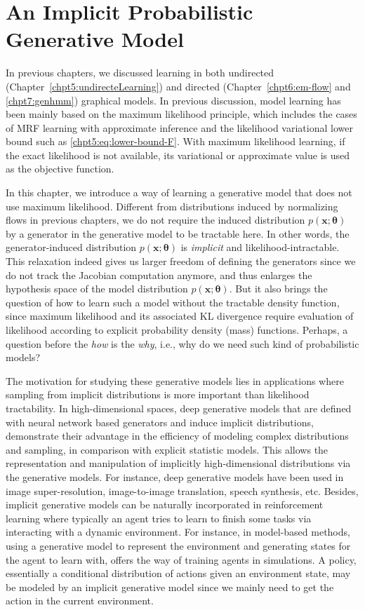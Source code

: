 \chapter{An Implicit Probabilistic Generative Model}
\label{chapter8}
\graphicspath{{source/chapter8/}}
In previous chapters, we discussed learning in both undirected (Chapter~\ref{chpt5:undirecteLearning}) and directed (Chapter~\ref{chpt6:em-flow} and \ref{chpt7:genhmm}) graphical models. In previous discussion, model learning has been mainly based on the maximum likelihood principle, which includes the cases of MRF learning with approximate inference and the likelihood variational lower bound such as \eqref{chpt5:eq:lower-bound-F}. With maximum likelihood learning, if the exact likelihood is not available, its variational or approximate value is used as the objective function.

In this chapter, we introduce a way of learning a generative model that does not use maximum likelihood. Different from distributions induced by normalizing flows in previous chapters, we do not require the induced distribution $p(\bm{x};\bm{\theta})$ by a generator in the generative model to be tractable here. In other words, the generator-induced distribution $p(\bm{x};\bm{\theta})$ is \textit{implicit} and likelihood-intractable. This relaxation indeed gives us larger freedom of defining the generators since we do not track the Jacobian computation anymore, and thus enlarges the hypothesis space of the model distribution $p(\bm{x};\bm{\theta})$. But it also brings the question of how to learn such a model without the tractable density function, since maximum likelihood and its associated KL divergence require evaluation of likelihood according to explicit probability density (mass) functions.  Perhaps, a question before the \textit{how} is the \textit{why}, i.e., why do we need such kind of probabilistic models?

The motivation for studying these generative models lies in applications where sampling from implicit distributions is more important than likelihood tractability. In high-dimensional spaces, deep generative models that are defined with neural network based generators and induce implicit distributions, demonstrate their advantage in the efficiency of modeling complex distributions and sampling, in comparison with explicit statistic models. This allows the representation and manipulation of implicitly high-dimensional distributions via the generative models. For instance, deep generative models have been used in image super-resolution, image-to-image translation, speech synthesis, etc. Besides, implicit generative models can be naturally incorporated in reinforcement learning where typically an agent tries to learn to finish some tasks via interacting with a dynamic environment. For instance, in model-based methods, using a generative model to represent the environment and generating states for the agent to learn with, offers the way of training agents in simulations. A policy, essentially a conditional distribution of actions given an environment state, may be modeled by an implicit generative model since we mainly need to get the action in the current environment.


